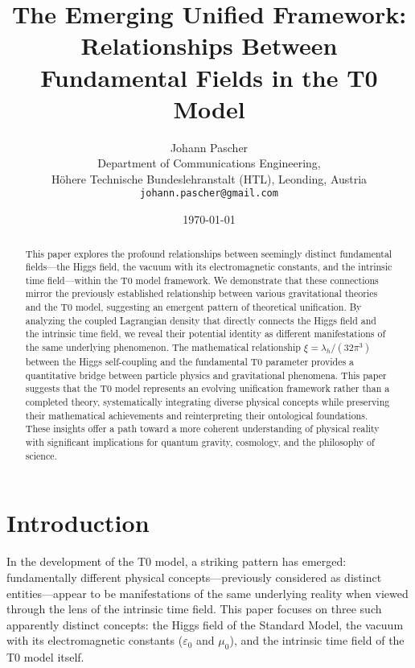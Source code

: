 \documentclass[12pt,a4paper]{article}
\begin{document}
	
	\title{The Emerging Unified Framework:\\Relationships Between Fundamental Fields in the T0 Model}
	\author{Johann Pascher\\
		Department of Communications Engineering, \\Höhere Technische Bundeslehranstalt (HTL), Leonding, Austria\\
		\texttt{johann.pascher@gmail.com}}
	\date{\today}
	
	\maketitle
	
	\begin{abstract}
		This paper explores the profound relationships between seemingly distinct fundamental fields—the Higgs field, the vacuum with its electromagnetic constants, and the intrinsic time field—within the T0 model framework. We demonstrate that these connections mirror the previously established relationship between various gravitational theories and the T0 model, suggesting an emergent pattern of theoretical unification. By analyzing the coupled Lagrangian density that directly connects the Higgs field and the intrinsic time field, we reveal their potential identity as different manifestations of the same underlying phenomenon. The mathematical relationship $\xi = \lambda_h/(32\pi^3)$ between the Higgs self-coupling and the fundamental T0 parameter provides a quantitative bridge between particle physics and gravitational phenomena. This paper suggests that the T0 model represents an evolving unification framework rather than a completed theory, systematically integrating diverse physical concepts while preserving their mathematical achievements and reinterpreting their ontological foundations. These insights offer a path toward a more coherent understanding of physical reality with significant implications for quantum gravity, cosmology, and the philosophy of science.
	\end{abstract}
	\newpage
	\tableofcontents
	\newpage
	\section{Introduction}
	\label{sec:introduction}
	
	In the development of the T0 model, a striking pattern has emerged: fundamentally different physical concepts—previously considered as distinct entities—appear to be manifestations of the same underlying reality when viewed through the lens of the intrinsic time field. This paper focuses on three such apparently distinct concepts: the Higgs field of the Standard Model, the vacuum with its electromagnetic constants ($\varepsilon_0$ and $\mu_0$), and the intrinsic time field of the T0 model itself.
	
\end{document}
